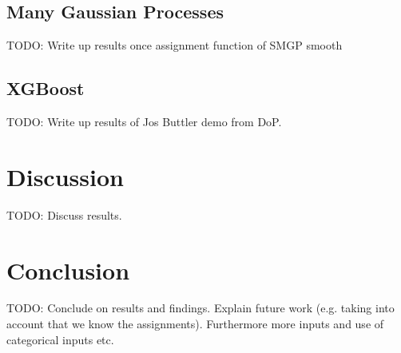 \documentclass[12pt,a4paper]{report}
\theoremstyle{definition}
\begin{document}
\section{Many Gaussian Processes}

TODO: Write up results once assignment function of SMGP smooth

\section{XGBoost}

TODO: Write up results of Jos Buttler demo from DoP.

\chapter{Discussion}

TODO: Discuss results.

\chapter{Conclusion}

TODO: Conclude on results and findings. Explain future work (e.g. taking into account that we know the assignments). Furthermore more inputs and use of categorical inputs etc.

\end{document}
